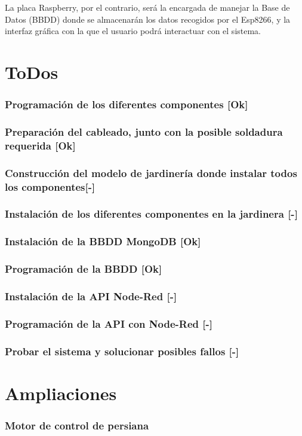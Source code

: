 \documentclass[12pt,a4paper,titlepage,oneside]{report}
\begin{document}
	La placa Raspberry, por el contrario, será la encargada de manejar la Base de Datos (BBDD) donde se almacenarán los datos recogidos por el Esp8266, y la interfaz gráfica con la que el usuario podrá interactuar con el sistema.

\chapter{ToDos}

	\subsection*{Programación de los diferentes componentes [Ok]}
	
	\subsection*{Preparación del cableado, junto con la posible soldadura requerida [Ok]}
	
	\subsection*{Construcción del modelo de jardinería donde instalar todos los componentes[-]}
	
	\subsection*{Instalación de los diferentes componentes en la jardinera [-]}
	
	\subsection*{Instalación de la BBDD MongoDB [Ok]}
	
	\subsection*{Programación de la BBDD [Ok]}
	
	\subsection*{Instalación de la API Node-Red [-]}
	
	\subsection*{Programación de la API con Node-Red [-]}
	
	\subsection*{Probar el sistema y solucionar posibles fallos [-]}

\chapter{Ampliaciones}

	\subsection*{Motor de control de persiana}
	
\end{document}
